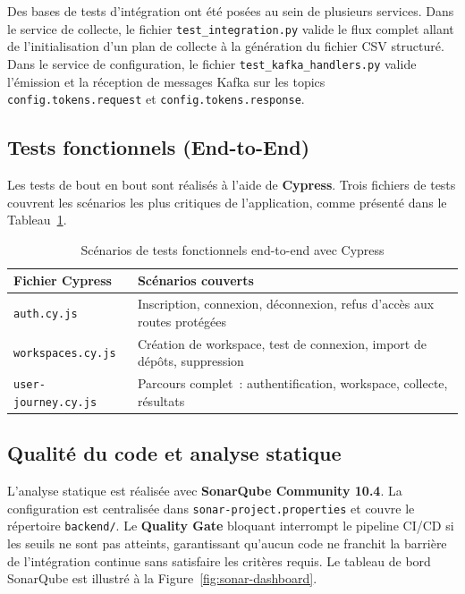 Des bases de tests d'intégration ont été posées au sein de plusieurs services. Dans le service
de collecte, le fichier \texttt{test\_integration.py} valide le flux complet allant de
l'initialisation d'un plan de collecte à la génération du fichier CSV structuré. Dans le service
de configuration, le fichier \texttt{test\_kafka\_handlers.py} valide l'émission et la réception
de messages Kafka sur les topics \texttt{config.tokens.request} et
\texttt{config.tokens.response}.

\subsection{Tests fonctionnels (End-to-End)}

Les tests de bout en bout sont réalisés à l'aide de \textbf{Cypress}. Trois fichiers de tests
couvrent les scénarios les plus critiques de l'application, comme présenté dans le
Tableau~\ref{tab:tests-cypress}.

\begin{table}[H]
\centering
\small
\caption{Scénarios de tests fonctionnels end-to-end avec Cypress}
\label{tab:tests-cypress}
\begin{tabular}{|>{\raggedright\arraybackslash}p{4cm}
                |>{\raggedright\arraybackslash}p{9cm}|}
\hline
\textbf{Fichier Cypress} & \textbf{Scénarios couverts} \\
\hline
\texttt{auth.cy.js} & Inscription, connexion, déconnexion, refus d'accès aux routes protégées \\
\hline
\texttt{workspaces.cy.js} & Création de workspace, test de connexion, import de dépôts, suppression \\
\hline
\texttt{user-journey.cy.js} & Parcours complet~: authentification, workspace, collecte, résultats \\
\hline
\end{tabular}
\end{table}

\subsection{Qualité du code et analyse statique}

L'analyse statique est réalisée avec \textbf{SonarQube Community 10.4}. La configuration est
centralisée dans \texttt{sonar-project.properties} et couvre le répertoire \texttt{backend/}.
Le \textbf{Quality Gate} bloquant interrompt le pipeline CI/CD si les seuils ne sont pas
atteints, garantissant qu'aucun code ne franchit la barrière de l'intégration continue sans
satisfaire les critères requis. Le tableau de bord SonarQube est illustré à la
Figure~\ref{fig:sonar-dashboard}.

